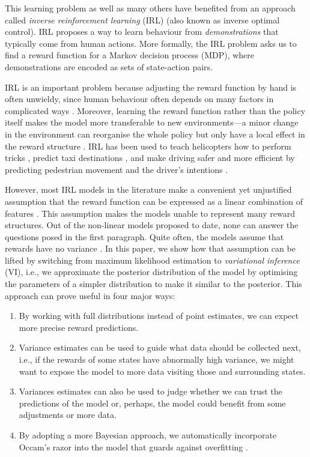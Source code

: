 \documentclass{mpaper}
\begin{document}
This learning problem
\cite{DBLP:journals/ijsr/KimP16,DBLP:journals/ijrr/KretzschmarSSB16} as well as
many others have benefited from an approach called \emph{inverse reinforcement
  learning} (IRL) (also known as inverse optimal control). IRL proposes a way to
learn behaviour from \emph{demonstrations} that typically come from human
actions. More formally, the IRL problem asks us to find a reward function for a
Markov decision process (MDP), where demonstrations are encoded as sets of
state-action pairs.

IRL is an important problem because adjusting the reward function by hand is
often unwieldy, since human behaviour often depends on many factors in
complicated ways
\cite{DBLP:conf/icml/PieterN04}. Moreover,
learning the reward function rather than the policy itself makes the model more
transferable to new environments---a minor change in the environment can
reorganise the whole policy but only have a local effect in the reward structure
\cite{DBLP:conf/uai/JinDAS17,DBLP:conf/nips/LevinePK11}.
IRL has been used to teach helicopters how to perform tricks
\cite{DBLP:conf/nips/AbbeelCQN06}, predict taxi destinations
\cite{DBLP:conf/huc/ZiebartMDB08}, and make driving safer and more efficient by
predicting pedestrian movement \cite{DBLP:conf/iros/ZiebartRGMPBHDS09} and the
driver's intentions \cite{DBLP:conf/aaai/VogelRGR12}.

However, most IRL models in the literature make a convenient yet unjustified
assumption that the reward function can be expressed as a linear combination of
features
\cite{DBLP:conf/icml/PieterN04,DBLP:conf/icml/NgR00,ziebart2008maximum}.
This assumption makes the models unable to represent many reward structures. Out
of the non-linear models proposed to date, none can answer the questions posed
in the first paragraph. Quite often, the models assume that rewards have no
variance \cite{DBLP:conf/nips/LevinePK11,DBLP:conf/uai/JinDAS17}. In this paper,
we show how that assumption can be lifted by switching from maximum likelihood
estimation to \emph{variational inference} (VI), i.e., we approximate the
posterior distribution of the model by optimising the parameters of a simpler
distribution to make it similar to the posterior. This approach can prove useful
in four major ways:
\begin{enumerate}
\item By working with full distributions instead of point estimates, we can
  expect more precise reward predictions.
\item Variance estimates can be used to guide what data should be collected
  next, i.e., if the rewards of some states have abnormally high variance, we
  might want to expose the model to more data visiting those and surrounding
  states.
\item Variances estimates can also be used to judge whether we can trust the
  predictions of the model or, perhaps, the model could benefit from some
  adjustments or more data.
\item By adopting a more Bayesian approach, we automatically incorporate Occam's
  razor into the model that guards against overfitting
  \cite{DBLP:conf/uai/JinDAS17}.
\end{enumerate}
\end{document}

